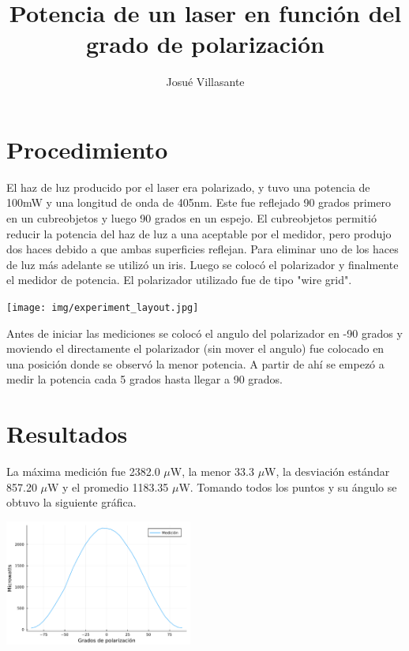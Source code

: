 \documentclass[twocolumn]{article}
\author{Josué Villasante}
\title{Potencia de un laser en función del grado de polarización}
\begin{document}
	\maketitle

	\section{Procedimiento}

		El haz de luz producido por el laser era polarizado, y tuvo una potencia de 100mW y una longitud de onda de 405nm. Este fue reflejado 90 grados primero en un cubreobjetos y luego 90 grados en un espejo. El cubreobjetos permitió reducir la potencia del haz de luz a una aceptable por el medidor, pero produjo dos haces debido a que ambas superficies reflejan. Para eliminar uno de los haces de luz más adelante se utilizó un iris. Luego se colocó el polarizador y finalmente el medidor de potencia. El polarizador utilizado fue de tipo "wire grid".

		\begin{center}
			\texttt{[image: img/experiment\_layout.jpg]}
		\end{center}

		Antes de iniciar las mediciones se colocó el angulo del polarizador en -90 grados y moviendo el directamente el polarizador (sin mover el angulo) fue colocado en una posición donde se observó la menor potencia. A partir de ahí se empezó a medir la potencia cada 5 grados hasta llegar a 90 grados.

	\section{Resultados}

		La máxima medición fue 2382.0 $\mu$W, la menor 33.3 $\mu$W, la desviación estándar 857.20 $\mu$W y el promedio 1183.35 $\mu$W. Tomando todos los puntos y su ángulo se obtuvo la siguiente gráfica.

		\begin{center}
			\includegraphics[width=175pt]{img/plot_raw.pdf}
		\end{center}
\end{document}
